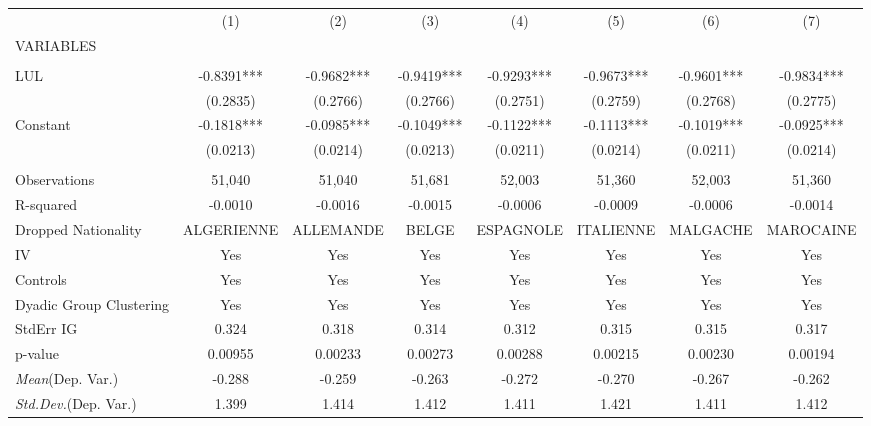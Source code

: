 \documentclass[]{article}
\begin{document}
\begin{tabular}{lccccccc} \hline
 & (1) & (2) & (3) & (4) & (5) & (6) & (7) \\
VARIABLES &  &  &  &  &  &  &  \\ \hline
 &  &  &  &  &  &  &  \\
LUL & -0.8391*** & -0.9682*** & -0.9419*** & -0.9293*** & -0.9673*** & -0.9601*** & -0.9834*** \\
 & (0.2835) & (0.2766) & (0.2766) & (0.2751) & (0.2759) & (0.2768) & (0.2775) \\
Constant & -0.1818*** & -0.0985*** & -0.1049*** & -0.1122*** & -0.1113*** & -0.1019*** & -0.0925*** \\
 & (0.0213) & (0.0214) & (0.0213) & (0.0211) & (0.0214) & (0.0211) & (0.0214) \\
 &  &  &  &  &  &  &  \\
Observations & 51,040 & 51,040 & 51,681 & 52,003 & 51,360 & 52,003 & 51,360 \\
R-squared & -0.0010 & -0.0016 & -0.0015 & -0.0006 & -0.0009 & -0.0006 & -0.0014 \\
Dropped Nationality & ALGERIENNE & ALLEMANDE & BELGE & ESPAGNOLE & ITALIENNE & MALGACHE & MAROCAINE \\
IV & Yes & Yes & Yes & Yes & Yes & Yes & Yes \\
Controls & Yes & Yes & Yes & Yes & Yes & Yes & Yes \\
Dyadic Group Clustering & Yes & Yes & Yes & Yes & Yes & Yes & Yes \\
StdErr IG & 0.324 & 0.318 & 0.314 & 0.312 & 0.315 & 0.315 & 0.317 \\
p-value & 0.00955 & 0.00233 & 0.00273 & 0.00288 & 0.00215 & 0.00230 & 0.00194 \\
\textit{Mean}(Dep. Var.) & -0.288 & -0.259 & -0.263 & -0.272 & -0.270 & -0.267 & -0.262 \\
 \textit{Std.Dev.}(Dep. Var.) & 1.399 & 1.414 & 1.412 & 1.411 & 1.421 & 1.411 & 1.412 \\ \hline
\end{tabular}
\end{document}
